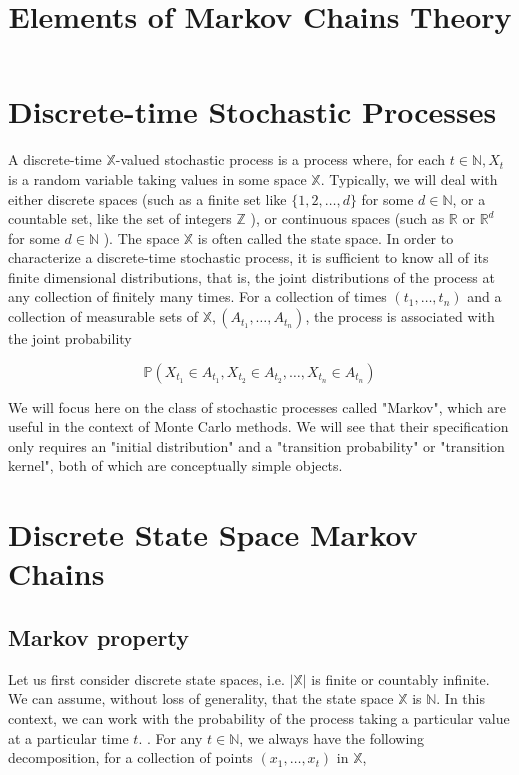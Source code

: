 \documentclass[10pt]{article}
\title{Elements of Markov Chains Theory}
\begin{document}
\maketitle


\section{Discrete-time Stochastic Processes}
A discrete-time $\mathbb{X}$-valued stochastic process is a process where, for each $t \in \mathbb{N}, X_{t}$ is a random variable taking values in some space $\mathbb{X}$. Typically, we will deal with either discrete spaces (such as a finite set like $\{1,2, \ldots, d\}$ for some $d \in \mathbb{N}$, or a countable set, like the set of integers $\mathbb{Z}$ ), or continuous spaces (such as $\mathbb{R}$ or $\mathbb{R}^{d}$ for some $d \in \mathbb{N}$ ). The space $\mathbb{X}$ is often called the state space. In order to characterize a discrete-time stochastic process, it is sufficient to know all of its finite dimensional distributions, that is, the joint distributions of the process at any collection of finitely many times. For a collection of times $\left(t_{1}, \ldots, t_{n}\right)$ and a collection of measurable sets of $\mathbb{X},\left(A_{t_{1}}, \ldots, A_{t_{n}}\right)$, the process is associated with the joint probability

$$
\mathbb{P}\left(X_{t_{1}} \in A_{t_{1}}, X_{t_{2}} \in A_{t_{2}}, \ldots, X_{t_{n}} \in A_{t_{n}}\right)
$$

We will focus here on the class of stochastic processes called "Markov", which are useful in the context of Monte Carlo methods. We will see that their specification only requires an "initial distribution" and a "transition probability" or "transition kernel", both of which are conceptually simple objects.

\section{Discrete State Space Markov Chains}
\subsection{Markov property}
Let us first consider discrete state spaces, i.e. $|\mathbb{X}|$ is finite or countably infinite. We can assume, without loss of generality, that the state space $\mathbb{X}$ is $\mathbb{N}$. In this context, we can work with the probability of the process taking a particular value at a particular time $t$. . For any $t \in \mathbb{N}$, we always have the following decomposition, for a collection of points $\left(x_{1}, \ldots, x_{t}\right)$ in $\mathbb{X}$,
\end{document}
